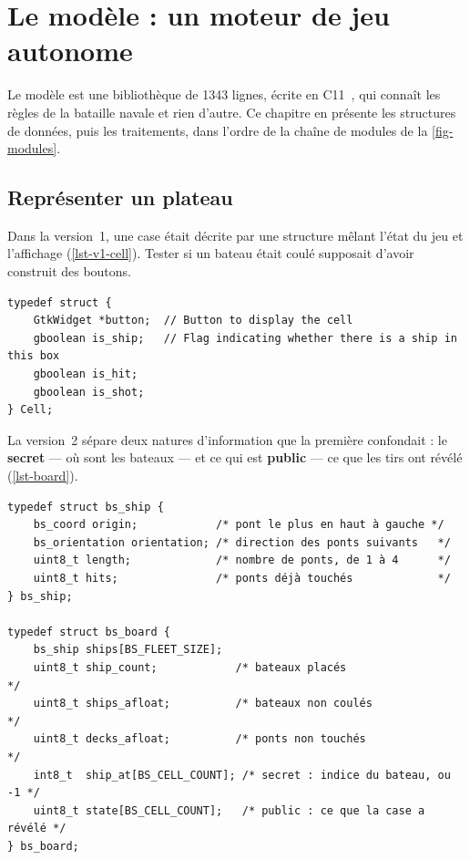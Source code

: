 \chapter{Le modèle : un moteur de jeu autonome}
\label{chap-modele}

Le modèle est une bibliothèque de \num{1343} lignes, écrite en C11~\cite{iso9899}, qui connaît
les règles de la bataille navale et rien d'autre. Ce chapitre en présente les structures de données, puis les
traitements, dans l'ordre de la chaîne de modules de la \cref{fig-modules}.

\section{Représenter un plateau}

Dans la version~1, une case était décrite par une structure mêlant l'état du jeu et
l'affichage (\cref{lst-v1-cell}). Tester si un bateau était coulé supposait d'avoir construit
des boutons.

\begin{lstlisting}[caption={Version~1 : la case connaît son bouton.}, label={lst-v1-cell}]
typedef struct {
    GtkWidget *button;  // Button to display the cell
    gboolean is_ship;   // Flag indicating whether there is a ship in this box
    gboolean is_hit;
    gboolean is_shot;
} Cell;
\end{lstlisting}

La version~2 sépare deux natures d'information que la première confondait : le
\textbf{secret} --- où sont les bateaux --- et ce qui est \textbf{public} --- ce que les
tirs ont révélé (\cref{lst-board}).

\begin{lstlisting}[caption={Le plateau d'un camp (\fichier{include/battleship/board.h}).},
                   label={lst-board}]
typedef struct bs_ship {
    bs_coord origin;            /* pont le plus en haut à gauche */
    bs_orientation orientation; /* direction des ponts suivants   */
    uint8_t length;             /* nombre de ponts, de 1 à 4      */
    uint8_t hits;               /* ponts déjà touchés             */
} bs_ship;

typedef struct bs_board {
    bs_ship ships[BS_FLEET_SIZE];
    uint8_t ship_count;            /* bateaux placés                    */
    uint8_t ships_afloat;          /* bateaux non coulés                */
    uint8_t decks_afloat;          /* ponts non touchés                 */
    int8_t  ship_at[BS_CELL_COUNT]; /* secret : indice du bateau, ou -1 */
    uint8_t state[BS_CELL_COUNT];   /* public : ce que la case a révélé */
} bs_board;
\end{lstlisting}


